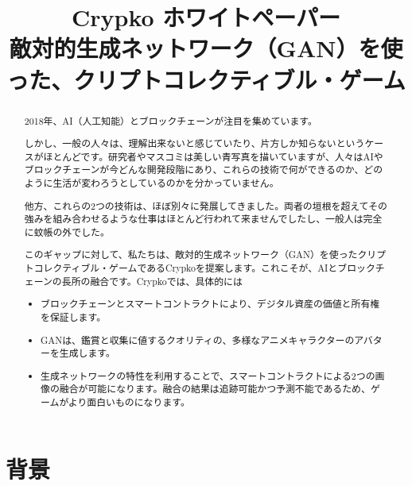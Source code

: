 \documentclass[xelatex,ja=standard]{bxjsarticle}
\title{Crypko ホワイトペーパー\\
  \large 敵対的生成ネットワーク（GAN）を使った、クリプトコレクティブル・ゲーム\\
  \rightline{\small ver 0.8.0}
}
\author{}
\date{}
\begin{document}
\maketitle

\renewcommand\abstractname{概　要}
\begin{abstract}

2018年、AI（人工知能）とブロックチェーンが注目を集めています。

しかし、一般の人々は、理解出来ないと感じていたり、片方しか知らないというケースがほとんどです。研究者やマスコミは美しい青写真を描いていますが、人々はAIやブロックチェーンが今どんな開発段階にあり、これらの技術で何ができるのか、どのように生活が変わろうとしているのかを分かっていません。

他方、これらの2つの技術は、ほぼ別々に発展してきました。両者の垣根を超えてその強みを組み合わせるような仕事はほとんど行われて来ませんでしたし、一般人は完全に蚊帳の外でした。

このギャップに対して、私たちは、敵対的生成ネットワーク（GAN）を使ったクリプトコレクティブル・ゲームであるCrypkoを提案します。これこそが、AIとブロックチェーンの長所の融合です。Crypkoでは、具体的には
\begin{itemize}
\item ブロックチェーンとスマートコントラクトにより、デジタル資産の価値と所有権を保証します。
\item GANは、鑑賞と収集に値するクオリティの、多様なアニメキャラクターのアバターを生成します。
\item 生成ネットワークの特性を利用することで、スマートコントラクトによる2つの画像の融合が可能になります。融合の結果は追跡可能かつ予測不能であるため、ゲームがより面白いものになります。
\end{itemize}

\end{abstract}

\thispagestyle{empty}

\newpage

\section{背景}
\end{document}
